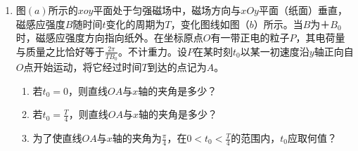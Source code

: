 \begin{enumerate}[leftmargin=0em]


\newpage
\item
{}
图$ (a) $所示的$ xoy $平面处于匀强磁场中，磁场方向与$ xOy $平面（纸面）垂直，磁感应强度$ B $随时间$ t $变化的周期为$ T $，变化图线如图（$ b $）所示。当$ B $为＋$ B_{0} $时，磁感应强度方向指向纸外。在坐标原点$ O $有一带正电的粒子$ P $，其电荷量与质量之比恰好等于$\frac { 2 \pi } { T B _ { 0 } }$。不计重力。设$ P $在某时刻$ t_{0} $以某一初速度沿$ y $轴正向自$ O $点开始运动，将它经过时间$ T $到达的点记为$ A $。
\begin{enumerate}
\renewcommand{\labelenumi}{\arabic{enumi}.}
\item
若$ t_{0} = 0 $，则直线$ OA $与$ x $轴的夹角是多少？
\item 
若$ t_{0}=\frac{T}{4} $，则直线$ OA $与$ x $轴的夹角是多少？
\item 
为了使直线$ OA $与$ x $轴的夹角为$ \frac{\pi}{4} $，在$ 0 < t_{0}<\frac{T}{4} $的范围内，$ t_{0} $应取何值？



\end{enumerate}
\begin{figure}[h!]
\flushright

\end{figure}

\end{enumerate}
